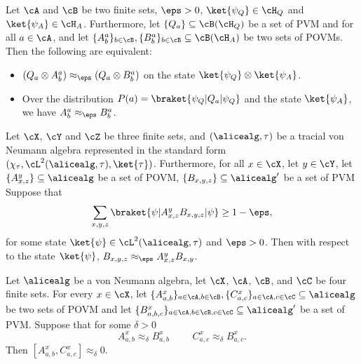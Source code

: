 \begin{lemma} \label{lem:QRsounddecomp}
	Let $\cA$ and $\cB$ be two finite sets, $\eps>0$, $\ket{\psi_Q} \in \cH_Q$ and $\ket{\psi_A} \in \cH_A$. Furthermore, let $\{ Q_{a} \} \subseteq \cB(\cH_Q)$ be a set of PVM and for all $a \in \cA$, and let $\{ A^a_b\}_{b \in \cB} ,\{ B^a_b\}_{b \in \cB} \subseteq \cB(\cH_A)$ be two sets of POVMs. Then the following are equivalent:
	\begin{itemize}
			\item $(Q_a \otimes A^a_b) \approx_{\eps}(Q_a \otimes B^a_b)$ on the state $\ket{\psi_Q} \otimes \ket{\psi_A}$.
			\item Over the distribution $P(a) =  \braket{\psi_Q| Q_a|\psi_Q}$ and the state $\ket{\psi_A}$, we have $ A^a_b \approx_{\eps} B^a_b$.
	\end{itemize} 
\end{lemma} 


\begin{lemma}  \label{lem:QRsoundnessproofLem3}
	Let $\cX$, $\cY$ and $\cZ$ be three finite sets, and $(\alicealg, \tau)$ be a tracial von Neumann algebra represented in the standard form $(\chi_{\tau}, \cL^2(\alicealg, \tau), \ket{\tau})$. Furthermore, for all $x \in \cX$, let $y \in \cY$, let $\{ A^{y}_{x,z}\} \subseteq \alicealg$ be a set of POVM, $\{B_{x,y,z}\} \subseteq \alicealg'$ be a set of PVM Suppose that
	\begin{equation*}
		\sum_{x,y,z} \braket{\psi| A^y_{x,z} B_{x,y,z} |\psi} \geq 1 -\eps,
	\end{equation*} 
	for some state $\ket{\psi} \in \cL^2(\alicealg, \tau)$ and $\eps > 0$. Then with respect to the state $\ket{\psi}$,  $ B_{x,y,z} \approx_{\eps}  A^y_{x,z} B_{x,y}$. 
\end{lemma}


\begin{lemma}  \label{lem:QRsoundnessproofcomm1}
	Let $\alicealg$ be a von Neumann algebra, let $\cX$, $\cA$, $\cB$, and $\cC$ be four finite sets. For every $x \in \cX $, let $\{A^x_{a, b}\}_{a \in \cA, b \in \cB}, \{C^x_{a, c}\}_{a \in \cA, c \in \cC} \subseteq \alicealg$ be two sets of POVM and let $\{B^x_{a,b,c}\}_{a \in \cA, b \in \cB, c \in \cC} \subseteq \alicealg'$ be a set of PVM. Suppose that for some $\delta > 0$
	\begin{equation*}
		A^x_{a,b} \approx_{\delta} B^x_{a,b} \, \qquad \, C^x_{a,c} \approx_{\delta} B^x_{a,c}. 
	\end{equation*}
	Then $[A^x_{a,b},  C^x_{a,c}]  \approx_{\delta} 0$.
\end{lemma}

